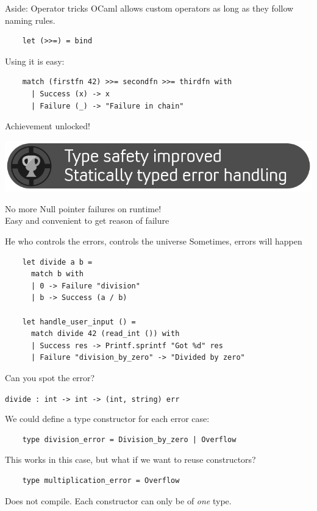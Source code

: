 \documentclass{beamer}
\renewcommand{\example}[1]{{\usebeamercolor[fg]{example text} #1}}
\begin{document}
\begin{frame}[fragile]{Aside: Operator tricks}
  OCaml allows \alert{custom operators} as long as they follow naming rules.

  \begin{verbatim}
    let (>>=) = bind
  \end{verbatim}

  Using it is \example{easy}:

  \begin{verbatim}
    match (firstfn 42) >>= secondfn >>= thirdfn with
      | Success (x) -> x
      | Failure (_) -> "Failure in chain"
  \end{verbatim}
\end{frame}

\begin{frame}{Achievement unlocked!}
  \begin{center}
    \includegraphics[width=\textwidth]{achivement-error-handling}
  \end{center}
  \checkmark No more Null pointer failures on runtime!\\
  \checkmark Easy and convenient to get reason of failure
\end{frame}

\begin{frame}[fragile]{He who controls the errors, controls the universe}
  Sometimes, errors will happen
  \begin{verbatim}
    let divide a b =
      match b with
      | 0 -> Failure "division"
      | b -> Success (a / b)

    let handle_user_input () =
      match divide 42 (read_int ()) with
      | Success res -> Printf.sprintf "Got %d" res
      | Failure "division_by_zero" -> "Divided by zero"
  \end{verbatim}
  Can you spot the error?\pause

  \texttt{divide : int -> int -> (int, string) err}
\end{frame}

\begin{frame}[fragile]
  We could define a type constructor for each error case:
  \begin{verbatim}
    type division_error = Division_by_zero | Overflow
  \end{verbatim}
  This works in this case, but what if we want to reuse constructors?
  \begin{verbatim}
    type multiplication_error = Overflow
  \end{verbatim}
  Does not compile. Each constructor can only be of \emph{one} type.
\end{frame}
\end{document}

